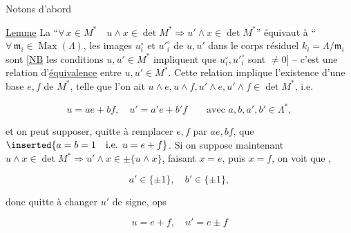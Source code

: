 Notons d'abord

\uline{Lemme} La  ``$\forall\,x\in M^*\quad u\wedge x\in\det M^*\Longrightarrow u'\wedge x\in\det M^*$'' équivaut à ``$\forall\,\mathfrak m_i\in\operatorname{Max}(\Lambda)$,  les images $u_i^\circ$ et $ {u'}_i^\circ$ de $u,u'$ dans le corps résiduel $k_i=\Lambda/\mathfrak m_i$ sont  [\uline{NB} les conditions $u,u'\in M^*$  impliquent que $u_i^\circ,{u'}_i^\circ$ sont $\ne0$] -- c'est  une relation d'\uline{équivalence} entre $u,u'\in M^*$. Cette relation implique l'existence d'une base $e,f$ de $M^*$, telle que l'on ait $u\wedge e,u\wedge f,u'\wedge e,u'\wedge f\in\det M^*$, i.e.

\[
u=ae+bf,\quad u'=a'e+b'f\qquad\text{avec }a,b,a',b'\in\Lambda^*,
\]

et on peut \unsure{$=$} supposer, quitte à remplacer $e,f$ par $ae,bf$, que $\inserted{a=b=1\quad\text{i.e. }u=e+f}$. Si on suppose maintenant $u\wedge x\in\det M^*\Longrightarrow u'\wedge x\in\pm\{u\wedge x\}$, faisant $x=e$, puis $x=f$, on voit que ,

\[
a'\in\{\pm1\},\quad b'\in\{\pm1\},
\]

donc quitte à changer $u'$ de signe, ops

\[
u=e+f,\quad u'=e\pm f
\]
